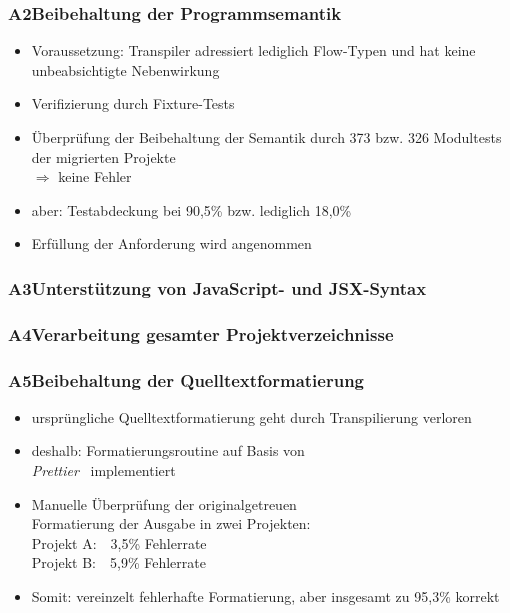       \begin{frame}
        \frametitle{A2\hspace{0.75em}Beibehaltung der Programmsemantik}
          \begin{itemize}
            \item Voraussetzung: Transpiler adressiert lediglich Flow-Typen und hat keine unbeabsichtigte Nebenwirkung
            \item Verifizierung durch Fixture-Tests
            \item Überprüfung der Beibehaltung der Semantik durch 373 bzw. 326 Modultests der migrierten Projekte\\
              \smallskip
              $\Rightarrow$ keine Fehler
            \item aber: Testabdeckung bei 90,5\% bzw. lediglich 18,0\%
            \item Erfüllung der Anforderung wird angenommen
          \end{itemize}
      \end{frame}

      \begin{frame}
        \frametitle{A3\hspace{0.75em}Unterstützung von JavaScript- und JSX-Syntax}
      \end{frame}

      \begin{frame}
        \frametitle{A4\hspace{0.75em}Verarbeitung gesamter Projektverzeichnisse}
      \end{frame}

      \begin{frame}
        \frametitle{A5\hspace{0.75em}Beibehaltung der Quelltextformatierung}
        \begin{itemize}
          \item ursprüngliche Quelltextformatierung geht durch Transpilierung verloren
          \item deshalb: Formatierungsroutine auf Basis von\\\textit{Prettier}~\autocite{SOFTWARE:PRETTIER} implementiert
          \item Manuelle Überprüfung der originalgetreuen\\Formatierung der Ausgabe in zwei Projekten:\\
            \medskip
            \hspace{1em}Projekt A:~~3,5\% Fehlerrate\\
            \smallskip
            \hspace{1em}Projekt B:~~5,9\% Fehlerrate
          \item Somit: vereinzelt fehlerhafte Formatierung, aber insgesamt zu 95,3\% korrekt
        \end{itemize}
      \end{frame}

